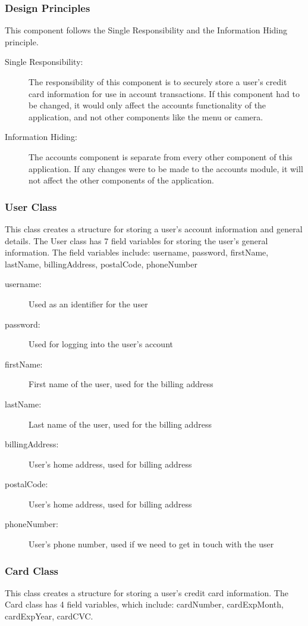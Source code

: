 \documentclass[12pt, titlepage]{article}
\begin{document}
\subsubsection{Design Principles}
This component follows the Single Responsibility and the Information Hiding principle.  

\begin{description}
	\item[Single Responsibility:] The responsibility of this component is to securely store a user's credit card information for use in account transactions. If this component had to be changed, it would only affect the accounts functionality of the application, and not other components like the menu or camera.
	\item[Information Hiding:] The accounts component is separate from every other component of this application. If any changes were to be made to the accounts module, it will not affect the other components of the application.
\end{description}

\subsubsection{User Class}
This class creates a structure for storing a user's account information and general details. The User class has 7 field variables for storing the user's general information. The field variables include: username, password, firstName, lastName, billingAddress, postalCode, phoneNumber

\begin{description}
  \item[username:] Used as an identifier for the user 
  \item[password:] Used for logging into the user's account 
  \item[firstName:] First name of the user, used for the billing address
  \item[lastName:] Last name of the user, used for the billing address
  \item[billingAddress:] User's home address, used for billing address
  \item[postalCode:] User's home address, used for billing address
  \item[phoneNumber:] User's phone number, used if we need to get in touch with the user
\end{description}

\subsubsection{Card Class}
This class creates a structure for storing a user's credit card information. The Card class has 4 field variables, which include: cardNumber, cardExpMonth, cardExpYear, cardCVC.
\end{document}
